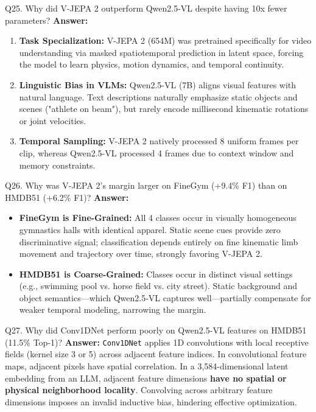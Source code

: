\documentclass[a4paper, 11pt]{article}
\begin{document}
\begin{questionbox}{Q25. Why did V-JEPA 2 outperform Qwen2.5-VL despite having 10x fewer parameters?}
\textbf{Answer:}
\begin{enumerate}
    \item \textbf{Task Specialization:} V-JEPA 2 (654M) was pretrained specifically for video understanding via masked spatiotemporal prediction in latent space, forcing the model to learn physics, motion dynamics, and temporal continuity.
    \item \textbf{Linguistic Bias in VLMs:} Qwen2.5-VL (7B) aligns visual features with natural language. Text descriptions naturally emphasize static objects and scenes ("athlete on beam"), but rarely encode millisecond kinematic rotations or joint velocities.
    \item \textbf{Temporal Sampling:} V-JEPA 2 natively processed 8 uniform frames per clip, whereas Qwen2.5-VL processed 4 frames due to context window and memory constraints.
\end{enumerate}
\end{questionbox}

\begin{questionbox}{Q26. Why was V-JEPA 2's margin larger on FineGym (+9.4\% F1) than on HMDB51 (+6.2\% F1)?}
\textbf{Answer:}
\begin{itemize}
    \item \textbf{FineGym is Fine-Grained:} All 4 classes occur in visually homogeneous gymnastics halls with identical apparel. Static scene cues provide zero discriminative signal; classification depends entirely on fine kinematic limb movement and trajectory over time, strongly favoring V-JEPA 2.
    \item \textbf{HMDB51 is Coarse-Grained:} Classes occur in distinct visual settings (e.g., swimming pool vs. horse field vs. city street). Static background and object semantics—which Qwen2.5-VL captures well—partially compensate for weaker temporal modeling, narrowing the margin.
\end{itemize}
\end{questionbox}

\begin{questionbox}{Q27. Why did Conv1DNet perform poorly on Qwen2.5-VL features on HMDB51 (11.5\% Top-1)?}
\textbf{Answer:}
\texttt{Conv1DNet} applies 1D convolutions with local receptive fields (kernel size 3 or 5) across adjacent feature indices. In convolutional feature maps, adjacent pixels have spatial correlation. In a 3,584-dimensional latent embedding from an LLM, adjacent feature dimensions \textbf{have no spatial or physical neighborhood locality}. Convolving across arbitrary feature dimensions imposes an invalid inductive bias, hindering effective optimization.
\end{questionbox}
\end{document}

